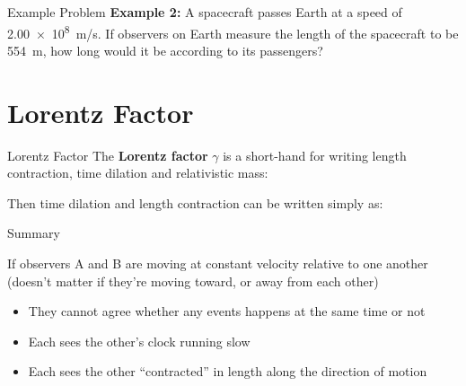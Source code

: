 \documentclass[12pt,compress,aspectratio=169]{beamer}
\newcommand{\bigsqrt}{\ensuremath\sqrt{1-\left(\frac{v}{c}\right)^2}}
\newcommand{\lorentz}{\ensuremath\frac{1}{\bigsqrt}}
\newcommand{\eq}[2]{\vspace{#1}{\Large\begin{displaymath}#2\end{displaymath}}}
\begin{document}
\begin{frame}{Example Problem}
  \textbf{Example 2:} A spacecraft passes Earth at a speed of \SI{2.00e8}{m/s}.
  If observers on Earth measure the length of the spacecraft to be
  \SI{554}{\metre}, how long would it be according to its passengers?
\end{frame}


\section{Lorentz Factor}

\begin{frame}{Lorentz Factor}
  The \textbf{Lorentz factor} $\gamma$ is a short-hand for writing length
  contraction, time dilation and relativistic mass:

  \eq{-.2in}{
    \boxed{\gamma=\lorentz}
  }
  
  Then time dilation and length contraction can be written simply as:
  
  \eq{-.1in}{
    \boxed{t' = \gamma t}\quad\boxed{L' = \frac{L}{\gamma}}
  }
\end{frame}


\begin{frame}{Summary}
  \begin{center}
  \end{center}
  If observers A and B are moving at constant velocity relative to one another
  (doesn't matter if they're moving toward, or away from each other)
  \begin{itemize}
  \item They cannot agree whether any events happens at the same time or not
  \item Each sees the other's clock running slow
  \item Each sees the other ``contracted'' in length along the direction of
    motion
  \end{itemize}
\end{frame}
\end{document}
